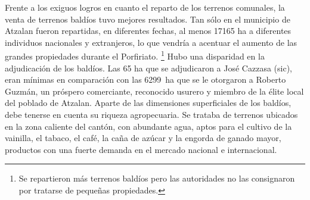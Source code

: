 \documentclass[14pt,twoside,final]{extbook} %
\let\oldfootnote\footnote
\renewcommand\footnote[1]{%
\oldfootnote{\hspace{1mm}#1}}
\begin{document}
Frente a los exiguos logros en cuanto el reparto de los terrenos comunales, la venta de terrenos baldíos tuvo mejores resultados. Tan sólo en el municipio de Atzalan fueron repartidas, en diferentes fechas, al menos 17165 ha a diferentes individuos nacionales y extranjeros, lo que vendría a acentuar el aumento de las grandes propiedades durante el Porfiriato.\footnote{Se repartieron más terrenos baldíos pero las autoridades no las consignaron por tratarse de pequeñas propiedades.} Hubo una disparidad en la adjudicación de los baldíos. Las 65 ha que se adjudicaron a José Cazzasa (sic), eran mínimas en comparación con las 6299~ha que se le otorgaron a Roberto Guzmán, un próspero comerciante, reconocido usurero y miembro de la élite local del poblado de Atzalan. Aparte de las dimensiones superficiales de los baldíos, debe tenerse en cuenta su riqueza agropecuaria. Se trataba de terrenos ubicados en la zona caliente del cantón, con abundante agua, aptos para el cultivo de la vainilla, el tabaco, el café, la caña de azúcar y la engorda de ganado mayor, productos con una fuerte demanda en el mercado nacional e internacional.
\end{document}
